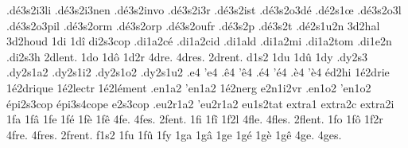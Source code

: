 {                    .dé3s2i3li
                    .dé3s2i3nen
                    .dé3s2invo
                    .dé3s2i3r
                    .dé3s2ist
                    .dé3s2o3dé
                    .dé2s1œ
                    .dé3s2o3l
                    .dé3s2o3pil
                    .dé3s2orm
                    .dé3s2orp
                    .dé3s2oufr
                    .dé3s2p %
                    .dé3s2t %
                    .dé2s1u2n
                    3d2hal
                    3d2houd
1di
1dî
                    di2s3cop
                    .di1a2cé
                    .di1a2cid
                    .di1ald
                    .di1a2mi
                    .di1a2tom
                    .di1e2n
                    .di2s3h
2dlent. %
1do
1dô
1d2r
4dre.
4dres.
2drent. %
d1s2
1du
1dû
1dy
                    .dy2s3
                    .dy2s1a2
                    .dy2s1i2
                    .dy2s1o2 %
                    .dy2s1u2
.e4
'e4
.ê4
'ê4
.é4
'é4
.è4
'è4
éd2hi %
                    1é2drie
                    1é2drique
                    1é2lectr
                    1é2lément
                    .en1a2
                    'en1a2
                    1é2nerg
                    e2n1i2vr
                    .en1o2
                    'en1o2
                    épi2s3cop
                    épi3s4cope
                    e2s3cop
                    .eu2r1a2
                    'eu2r1a2
                    eu1s2tat
                    extra1
                    extra2c
                    extra2i
1fa
1fâ
1fe
1fé
1fè
1fê
4fe.
4fes.
2fent. %
%
1fi
1fî
1f2l
4fle.
4fles.
2flent. %
1fo
1fô
1f2r
4fre.
4fres.
2frent. %
f1s2
1fu
1fû
1fy
1ga
1gâ
1ge
1gé
1gè
1gê
4ge.
4ges.
}
